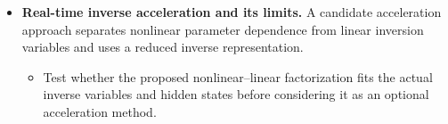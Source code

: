 \begin{itemize}[leftmargin=*]
\begin{itemize}
\item Check admissibility for individual parameter/\allowbreak{}closure draws; a stable mean operator does not establish stability, conservation or physical branch behavior for every realization.
\end{itemize}
\item {}\textbf{Real-time inverse acceleration and its limits.} A candidate acceleration approach separates nonlinear parameter dependence from linear inversion variables and uses a reduced inverse representation.
\begin{itemize}
\item Test whether the proposed nonlinear--linear factorization fits the actual inverse variables and hidden states before considering it as an optional acceleration method.
\end{itemize}
\end{itemize}

